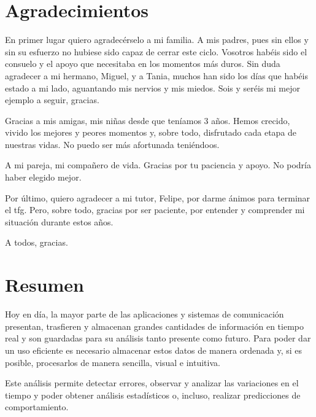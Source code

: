 \documentclass[a4paper, 12pt]{book}
\begin{document}

\chapter*{Agradecimientos}

En primer lugar quiero agradecérselo a mi familia. A mis padres, pues sin ellos y sin su esfuerzo no hubiese sido capaz de cerrar este ciclo. Vosotros habéis sido el consuelo y el apoyo que necesitaba en los momentos más duros. Sin duda agradecer a mi hermano, Miguel, y a Tania, muchos han sido los días que habéis estado a mi lado, aguantando mis nervios y mis miedos. Sois y seréis mi mejor ejemplo a seguir, gracias.

Gracias a mis amigas, mis niñas desde que teníamos 3 años. Hemos crecido, vivido los mejores y peores momentos y, sobre todo, disfrutado cada etapa de nuestras vidas. No puedo ser más afortunada teniéndoos.

A mi pareja, mi compañero de vida. Gracias por tu paciencia y apoyo. No podría haber elegido mejor. 

Por último, quiero agradecer a mi tutor, Felipe, por darme ánimos para terminar el \acrshort{tfg}. Pero, sobre todo, gracias por ser paciente, por entender y comprender mi situación durante estos años.

A todos, gracias.


\chapter*{Resumen}

Hoy en día, la mayor parte de las aplicaciones y sistemas de comunicación presentan, trasfieren y almacenan grandes cantidades de información en tiempo real y son guardadas para su análisis tanto presente como futuro. 
Para poder dar un uso eficiente es necesario almacenar estos datos de manera ordenada y, si es posible, procesarlos de manera sencilla, visual e intuitiva.

Este análisis permite detectar errores, observar y analizar las variaciones en el tiempo y poder obtener análisis estadísticos o, incluso, realizar predicciones de  comportamiento. 
\end{document}
